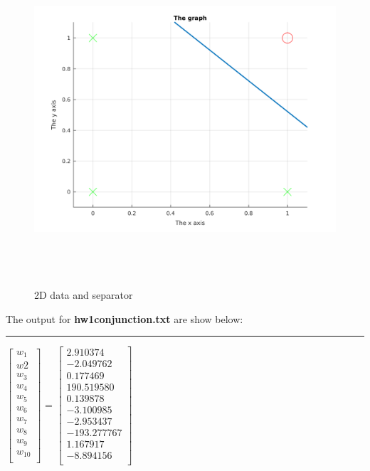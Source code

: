 \begin{enumerate}
\begin{enumerate}
\begin{enumerate}
\begin{figure}[h]
\centering
\includegraphics[height = 350pt]{2d.png}
\caption{2D data and separator}
\end{figure}

The output for {\bf hw1conjunction.txt} are show below:\\

\rule{400pt}{2pt}
\begin{center}
$\begin{bmatrix}
w_1 \\ w2 \\ w_3 \\ w_4 \\ w_5 \\ w_6 \\ w_7 \\ w_8 \\ w_9 \\ w_{10} \\ 
\end{bmatrix}$ = $\begin{bmatrix}
2.910374 \\ -2.049762 \\ 0.177469 \\ 190.519580 \\ 0.139878 \\ -3.100985 \\ -2.953437 \\ -193.277767 \\ 1.167917 \\ -8.894156 \\
\end{bmatrix}$\\


\end{center}
\end{enumerate}
\end{enumerate}
\end{enumerate}
